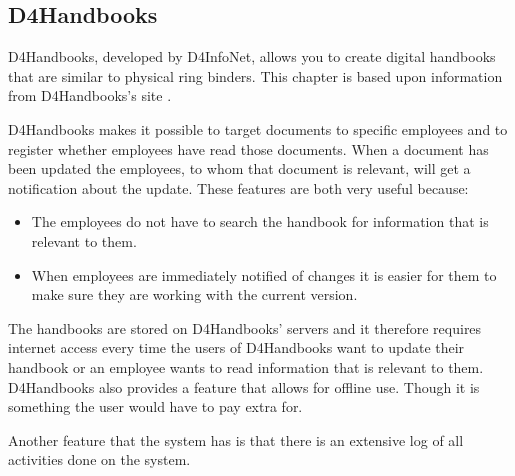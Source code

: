 \subsection{D4Handbooks} \label{sec:d4handbooks}

D4Handbooks, developed by D4InfoNet, allows you to create digital handbooks that are similar to physical ring binders.
This chapter is based upon information from D4Handbooks's site \cite{D4Handbook}.

D4Handbooks makes it possible to target documents to specific employees and to register whether employees have read those documents.
When a document has been updated the employees, to whom that document is relevant, will get a notification about the update.
These features are both very useful because:

\begin{itemize}
        \item
        The employees do not have to search the handbook for information that is relevant to them.
        \item
        When employees are immediately notified of changes it is easier for them to make sure they are working with the current version.
\end{itemize}

The handbooks are stored on D4Handbooks' servers and it therefore requires internet access every time the users of D4Handbooks want to update their handbook or an employee wants to read information that is relevant to them.
D4Handbooks also provides a feature that allows for offline use.
Though it is something the user would have to pay extra for.

Another feature that the system has is that there is an extensive log of all activities done on the system.
